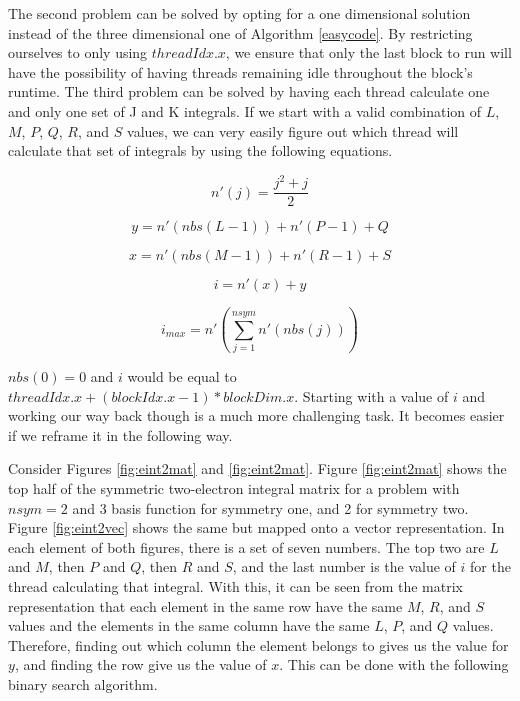 \documentclass[12pt]{report}
\begin{document}
The second problem can be solved by opting for a one dimensional solution instead of the three dimensional one of Algorithm \ref{easycode}. By restricting ourselves to only using $threadIdx.x$, we ensure that only the last block to run will have the possibility of having threads remaining idle throughout the block's runtime. The third problem can be solved by having each thread calculate one and only one set of J and K integrals. If we start with a valid combination of $L$, $M$, $P$, $Q$, $R$, and $S$ values, we can very easily figure out which thread will calculate that set of integrals by using the following equations.

\begin{equation}
\label{nprime}
n'(j) = \frac{j^{2}+j}{2}
\end{equation}

\begin{equation}
\label{ylpq}
y = n'(nbs(L - 1)) + n'(P - 1) + Q
\end{equation}

\begin{equation}
\label{xmrs}
x = n'(nbs(M - 1)) + n'(R - 1) + S
\end{equation}

\begin{equation}
\label{numtothread}
i = n'(x) + y
\end{equation}

\begin{equation}
\label{imax}
i_{max} = n'(\sum^{nsym}_{j = 1}n'(nbs(j)))
\end{equation}

$nbs(0) = 0$ and $i$ would be equal to $threadIdx.x + (blockIdx.x - 1) * blockDim.x$. Starting with a value of $i$ and working our way back though is a much more challenging task. It becomes easier if we reframe it in the following way.

Consider Figures \ref{fig:eint2mat} and \ref{fig:eint2mat}. Figure \ref{fig:eint2mat} shows the top half of the symmetric two-electron integral matrix for a problem with $nsym = 2$ and 3 basis function for symmetry one, and 2 for symmetry two. Figure \ref{fig:eint2vec} shows the same but mapped onto a vector representation. In each element of both figures, there is a set of seven numbers. The top two are $L$ and $M$, then $P$ and $Q$, then $R$ and $S$, and the last number is the value of $i$ for the thread calculating that integral. With this, it can be seen from the matrix representation that each element in the same row have the same $M$, $R$, and $S$ values and the elements in the same column have the same $L$, $P$, and $Q$ values. Therefore, finding out which column the element belongs to gives us the value for $y$, and finding the row give us the value of $x$. This can be done with the following binary search algorithm.
\end{document}
